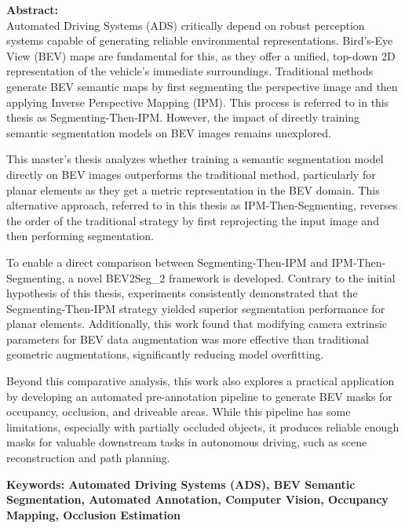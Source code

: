 \begin{itshape}
    \textbf{Abstract:} \\

Automated Driving Systems (ADS) critically depend on robust perception systems capable of generating reliable environmental representations. Bird's-Eye View (BEV) maps are fundamental for this, as they offer a unified, top-down 2D representation of the vehicle's immediate surroundings. Traditional methods generate BEV semantic maps by first segmenting the perspective image and then applying Inverse Perspective Mapping (IPM). This process is referred to in this thesis as Segmenting-Then-IPM. However, the impact of directly training semantic segmentation models on BEV images remains unexplored.

This master's thesis analyzes whether training a semantic segmentation model directly on BEV images outperforms the traditional method, particularly for planar elements as they get a metric representation in the BEV domain. This alternative approach, referred to in this thesis as IPM-Then-Segmenting, reverses the order of the traditional strategy by first reprojecting the input image and then performing segmentation.

To enable a direct comparison between Segmenting-Then-IPM and IPM-Then-Segmenting, a novel BEV2Seg\_2 framework is developed. Contrary to the initial hypothesis of this thesis, experiments consistently demonstrated that the Segmenting-Then-IPM strategy yielded superior segmentation performance for planar elements. Additionally, this work found that modifying camera extrinsic parameters for BEV data augmentation was more effective than traditional geometric augmentations, significantly reducing model overfitting.

Beyond this comparative analysis, this work also explores a practical application by developing an automated pre-annotation pipeline to generate BEV masks for occupancy, occlusion, and driveable areas.  While this pipeline has some limitations, especially with partially occluded objects, it produces reliable enough masks for valuable downstream tasks in autonomous driving, such as scene reconstruction and path planning. 

    \textbf{Keywords: Automated Driving Systems (ADS), BEV Semantic Segmentation, Automated Annotation, Computer Vision, Occupancy Mapping, Occlusion Estimation}
\end{itshape}
\newpage
